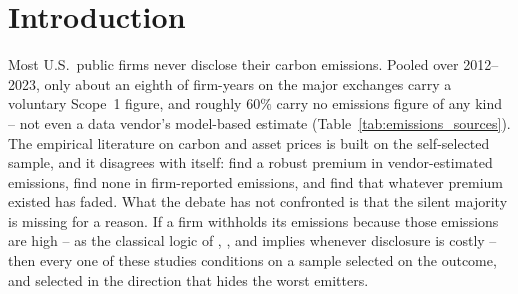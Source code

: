 \documentclass[a4paper,12pt]{article}
\newcommand{\citet}[1]{\textcite{#1}}
\begin{document}

\section{Introduction}
\label{sec:intro}

Most U.S.\ public firms never disclose their carbon emissions. Pooled over 2012--2023, only about an eighth of firm-years on the major exchanges carry a voluntary Scope~1 figure, and roughly $60\%$ carry no emissions figure of any kind -- not even a data vendor's model-based estimate (Table~\ref{tab:emissions_sources}). The empirical literature on carbon and asset prices is built on the self-selected sample, and it disagrees with itself: \citet{bolton2021investors} find a robust premium in vendor-estimated emissions, \citet{aswani2024carbon} find none in firm-reported emissions, and \citet{pastor2025green} find that whatever premium existed has faded. What the debate has not confronted is that the silent majority is missing for a reason. If a firm withholds its emissions because those emissions are high -- as the classical logic of \citet{grossman1981informational}, \citet{milgrom1981good}, and \citet{verrecchia1983discretionary} implies whenever disclosure is costly -- then every one of these studies conditions on a sample selected on the outcome, and selected in the direction that hides the worst emitters.
\end{document}
